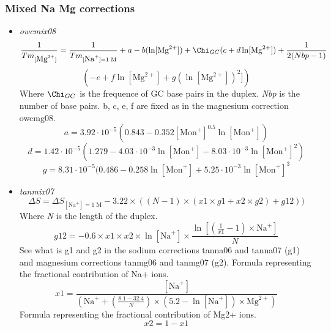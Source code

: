 \documentclass{article}
\begin{document}
\subsubsection{Mixed Na Mg corrections} 
 \begin{itemize}
 \item \textit{owcmix08}
 \begin{displaymath}
 \frac{1}{Tm_{[\mbox{Mg}^{2+}]}} = \frac{1}{Tm_{[\mbox{Na}^+]=1\;\mathrm{M}}} + a
 - b (\ln [\mbox{Mg}^{2+}]) + \Chi_{GC} (c + d \ln [\mbox{Mg}^{2+}]) + \frac{1}{2 (Nbp-1)} 
 \end{displaymath}
 \begin{displaymath}
 (-e + f \ln [\mbox{Mg}^{2+}] + g (\ln [\mbox{Mg}^{2+}])^{2}])
 \end{displaymath}
 Where \emph{$\Chi_{GC}$} is the frequence of GC base pairs in the duplex.
 \emph{Nbp} is the number of base pairs.
 b, c, e, f are fixed as in the magnesium correction owcmg08.
 \begin{displaymath}
 a = 3.92\cdot{}10^{-5} (0.843 - 0.352 [\mbox{Mon}^+]^{0.5} \ln [\mbox{Mon}^+]) 
 \end{displaymath}
 \begin{displaymath}
 d = 1.42\cdot{}10^{-5} (1.279 - 4.03\cdot{}10^{-3} \ln [\mbox{Mon}^+] -
 8.03\cdot{}10^{-3} \ln [\mbox{Mon}^+]^{2})
 \end{displaymath}
 \begin{displaymath}
 g = 8.31\cdot{}10^{-5} (0.486 - 0.258 \ln [\mbox{Mon}^+] + 5.25\cdot{}10^{-3}
 \ln [\mbox{Mon}^+]^{3} 
 \end{displaymath}
 \item \textit{tanmix07}
 \begin{displaymath}
 \Delta{}S=\Delta{}S_{[\mbox{Na}^+]=1\;\mathrm{M}}- 3.22 \times ((N - 1) \times (x1 \times g1 + x2 \times g2) + g12))  
 \end{displaymath}
 Where \emph{N} is the length of the duplex.
 \begin{displaymath}
  g12 = -0.6 \times x1 \times x2 \times \ln [\mbox{Na}^+] \times \frac{\ln [(\frac{1}{x1} - 1) \times \mbox{Na}^+]}{N}  
 \end{displaymath}
  See what is g1 and g2 in the sodium corrections tanna06 and tanna07 (g1) and
  magnesium corrections tanmg06 and tanmg07 (g2).
  Formula representing the fractional contribution of Na+ ions.
 \begin{displaymath}
  x1 = \frac{[\mbox{Na}^+]}{(\mbox{Na}^+ + (\frac{8.1 - 32.4}{N}) \times (5.2 - \ln [\mbox{Na}^+]) \times \mbox{Mg}^{2+})}  
 \end{displaymath}
 Formula representing the fractional contribution of Mg2+ ions.
 \begin{displaymath}
  x2= 1-x1  
 \end{displaymath}
 \end{itemize}
\end{document}
